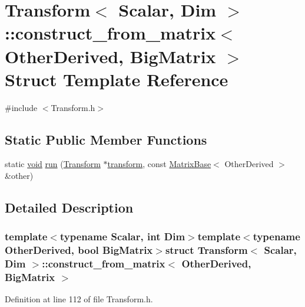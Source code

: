 \hypertarget{struct_transform_1_1construct__from__matrix}{\section{Transform$<$ Scalar, Dim $>$\-:\-:construct\-\_\-from\-\_\-matrix$<$ Other\-Derived, Big\-Matrix $>$ Struct Template Reference}
\label{struct_transform_1_1construct__from__matrix}
}


{\ttfamily \#include $<$Transform.\-h$>$}

\subsection*{Static Public Member Functions}
\begin{DoxyCompactItemize}
\item 
static \hyperlink{group___u_a_v_objects_plugin_ga444cf2ff3f0ecbe028adce838d373f5c}{void} \hyperlink{struct_transform_1_1construct__from__matrix_ae50f34a89f7875025d1cd0470814d6ad}{run} (\hyperlink{class_transform}{Transform} $\ast$\hyperlink{glext_8h_a07993c0d92c1aeeb357ba0495c8b5325}{transform}, const \hyperlink{class_matrix_base}{Matrix\-Base}$<$ Other\-Derived $>$ \&other)
\end{DoxyCompactItemize}


\subsection{Detailed Description}
\subsubsection*{template$<$typename Scalar, int Dim$>$template$<$typename Other\-Derived, bool Big\-Matrix$>$struct Transform$<$ Scalar, Dim $>$\-::construct\-\_\-from\-\_\-matrix$<$ Other\-Derived, Big\-Matrix $>$}



Definition at line 112 of file Transform.\-h.



